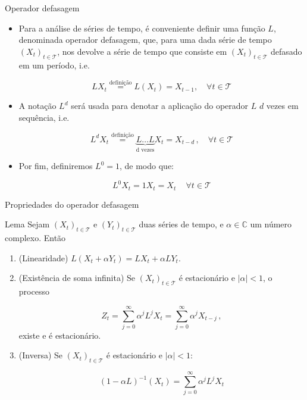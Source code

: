\documentclass[11pt]{beamer}
\begin{document}
	
	\begin{frame}{Operador defasagem}
		\begin{itemize}
			\item Para a análise de séries de tempo, é conveniente definir uma função $L$, denominada operador defasagem, que, para uma dada série de tempo $(X_t)_{t \in \mathcal{T}}$, nos devolve a série de tempo que consiste em  $(X_t)_{t \in \mathcal{T}}$ defasado em um período, i.e.
			
			$$L X_t \overset{\text{definição}}{=} L(X_t) = X_{t-1}, \quad \forall t \in \mathcal{T}$$
			\item A notação $L^d$ será usada para denotar a aplicação do operador $L$ $d$ vezes em sequência, i.e.
			
			$$L^d X_t \overset{\text{definição}}{=} \underbrace{L\ldots L}_{\text{d vezes}} X_t = X_{t-d}\, , \quad \forall t \in \mathcal{T}$$
			\item Por fim, definiremos $L^0 = 1$, de modo que:
			
			$$L^0 X_t = 1 X_t = X_t\, \quad \forall t \in \mathcal{T}$$
		\end{itemize}
	\end{frame}
	
	\begin{frame}{Propriedades do operador defasagem}
		\begin{block}{Lema}
			Sejam $(X_t)_{t \in \mathcal{T}}$ e $(Y_t)_{t \in \mathcal{T}}$ duas séries de tempo, e $\alpha \in \mathbb{C}$ um número complexo. Então
			\begin{enumerate}
				\item (Linearidade) $L(X_t+\alpha Y_t) =LX_t + \alpha LY_t$.
				\item (Existência de soma infinita) Se $(X_t)_{t \in \mathcal{T}}$ é estacionário e  $|\alpha|<1$, o processo
				
				$$Z_t= \sum_{j=0}^{\infty} \alpha^j L^j X_{t} = \sum_{j=0}^{\infty} \alpha^j X_{t-j}\, ,$$
				existe e é estacionário.
				\item (Inversa) Se $(X_t)_{t \in \mathcal{T}}$ é estacionário e  $|\alpha|<1$:
				
				$$(1-\alpha L)^{-1}(X_t) = \sum_{j=0}^{\infty} \alpha^j L^j X_t$$
			\end{enumerate}
		\end{block}
	\end{frame}
\end{document}
